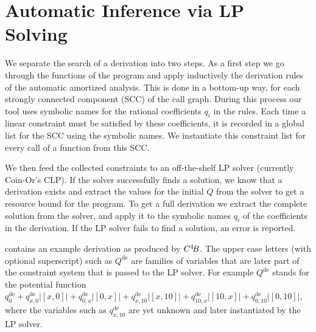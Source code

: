\documentclass[nocopyrightspace,preprint,pldi]{sigplanconf-pldi15}
\newcommand{\ifshort}[2]{\ifx\fullversion\undefined{#1}\else{#2}\fi}
\newcommand{\sectskip}[0]{\ifshort{\vspace{-3pt}}{}}
\newcommand{\aftersectskip}[0]{\ifshort{\vspace{-1pt}}{}}
\newcommand{\pref}[1]{\prettyref{#1}}
\begin{document}
\sectskip
\section{Automatic Inference via LP Solving}
\label{sec:lp}
\aftersectskip

We separate the search of a derivation into two steps.  As a first
step we go through the functions of the program and apply inductively
the derivation rules of the automatic amortized analysis.  This is
done in a bottom-up way, for each strongly connected component (SCC) of the
call graph.  During this
process our tool uses symbolic names for the rational coefficients
$q_i$ in the rules.  Each time a linear constraint must be
satisfied by these coefficients, it is recorded in a global list for the SCC using
the symbolic names.  We instantiate this constraint list for every call of
a function from this SCC.


We then feed the collected constraints to an
off-the-shelf LP solver (currently Coin-Or's CLP).
If the solver successfully finds a solution, we know that a derivation
exists and extract the values for the initial
$Q$ from the solver to get a resource bound for the program.  To get
a full derivation we extract the complete solution from the
solver, and apply it to the symbolic names $q_i$ of the coefficients
in the derivation.  If the LP solver fails to find a solution, an
error is reported.

\pref{fig:derivation} contains an example derivation as produced
by $C^4\!B$.  The upper case letters (with optional
superscript) such as $Q^\text{de}$ are families of
variables that are later part of the constraint system that is passed
to the LP solver.  For example $Q^\text{de}$ stands for the potential
function $q^\text{de}_0 + q^\text{de}_{x,0} |[x,0]| +
q^\text{de}_{0,x} |[0,x]| + q^\text{de}_{x,10} |[x,10]| +
q^\text{de}_{10,x} |[10,x]| + q^\text{de}_{0,10} |[0,10]|$, where the
variables such as $q^\text{de}_{x,10}$ are yet unknown and later
instantiated by the LP solver.
\end{document}
